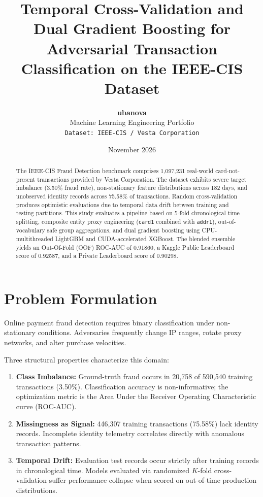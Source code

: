 \documentclass[10pt,twocolumn,a4paper]{article}
\title{\textbf{Temporal Cross-Validation and Dual Gradient Boosting for Adversarial Transaction Classification on the IEEE-CIS Dataset}}
\author{\textbf{ubanova} \\ Machine Learning Engineering Portfolio \\ \texttt{Dataset: IEEE-CIS / Vesta Corporation}}
\date{November 2026}
\begin{document}
\maketitle

\begin{abstract}
The IEEE-CIS Fraud Detection benchmark comprises 1,097,231 real-world card-not-present transactions provided by Vesta Corporation. The dataset exhibits severe target imbalance (3.50\% fraud rate), non-stationary feature distributions across 182 days, and unobserved identity records across 75.58\% of transactions. Random cross-validation produces optimistic evaluations due to temporal data drift between training and testing partitions. This study evaluates a pipeline based on 5-fold chronological time splitting, composite entity proxy engineering (\texttt{card1} combined with \texttt{addr1}), out-of-vocabulary safe group aggregations, and dual gradient boosting using CPU-multithreaded LightGBM and CUDA-accelerated XGBoost. The blended ensemble yields an Out-Of-Fold (OOF) ROC-AUC of 0.91860, a Kaggle Public Leaderboard score of 0.92587, and a Private Leaderboard score of 0.90298.
\end{abstract}

\section{Problem Formulation}
Online payment fraud detection requires binary classification under non-stationary conditions. Adversaries frequently change IP ranges, rotate proxy networks, and alter purchase velocities. 

Three structural properties characterize this domain:
\begin{enumerate}
    \item \textbf{Class Imbalance:} Ground-truth fraud occurs in 20,758 of 590,540 training transactions (3.50\%). Classification accuracy is non-informative; the optimization metric is the Area Under the Receiver Operating Characteristic curve (ROC-AUC).
    \item \textbf{Missingness as Signal:} 446,307 training transactions (75.58\%) lack identity records. Incomplete identity telemetry correlates directly with anomalous transaction patterns.
    \item \textbf{Temporal Drift:} Evaluation test records occur strictly after training records in chronological time. Models evaluated via randomized $K$-fold cross-validation suffer performance collapse when scored on out-of-time production distributions.
\end{enumerate}
\end{document}
